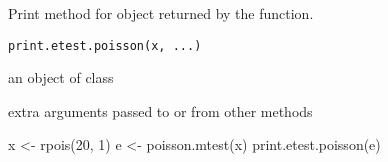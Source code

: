 \begin{Description}\relax
Print method for  object returned by the 
 function.
\end{Description}
\begin{Usage}
\begin{verbatim}
print.etest.poisson(x, ...)
\end{verbatim}
\end{Usage}
\begin{Arguments}
\begin{ldescription}
\item[\code{x}] an object of class  
\item[\code{...}] extra arguments passed to or from other methods 
\end{ldescription}
\end{Arguments}
\begin{SeeAlso}\relax
{}
\end{SeeAlso}
\begin{Examples}
\begin{ExampleCode}
 x <- rpois(20, 1)
 e <- poisson.mtest(x)
 print.etest.poisson(e)
 \end{ExampleCode}
\end{Examples}

